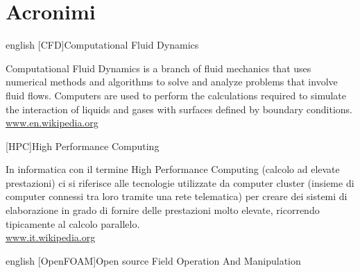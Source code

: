 %
%
\cleardoublepage
%
\chapter{Acronimi}
%
%
\begin{acronym}[OpenFOAM]	%
%
%
%
%
\begin{otherlanguage*}{english}
%
[CFD]{Computational Fluid Dynamics}

{\smaller Computational Fluid Dynamics is a branch of fluid mechanics that uses numerical methods and algorithms to solve and analyze problems that involve fluid flows. Computers are used to perform the calculations required to simulate the interaction of liquids and gases with surfaces defined by boundary conditions.\\
\href{http://en.wikipedia.org/wiki/Computational_fluid_dynamics}{www.en.wikipedia.org}
\par}
%
\end{otherlanguage*}
%
%
[HPC]{High Performance Computing}

{\smaller In informatica con il termine High Performance Computing (calcolo ad elevate prestazioni) ci si riferisce alle tecnologie utilizzate da computer cluster (insieme di computer connessi tra loro tramite una rete telematica) per creare dei sistemi di elaborazione in grado di fornire delle prestazioni molto elevate, ricorrendo tipicamente al calcolo parallelo.\\
\href{http://it.wikipedia.org/wiki/High_Performance_Computing}{www.it.wikipedia.org}
\par}
%
%
\begin{otherlanguage*}{english}
%
[OpenFOAM]{Open source Field Operation And Manipulation}


\end{otherlanguage*}
\end{acronym}
